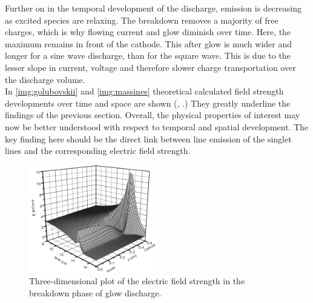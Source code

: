 \documentclass[a4paper,10pt,twoside]{article}
\begin{document}
		Further on in the temporal development of the discharge, emission is decreasing as excited species are relaxing. The breakdown removes a majority of free charges, which is why flowing current and glow diminish over time. Here, the maximum remains in front of the cathode. This after glow is much wider and longer for a sine wave discharge, than for the square wave. This is due to the lesser slope in current, voltage and therefore slower charge transportation over the discharge volume.\\
		In \autoref{img:golubovskii} and \autoref{img:massines} theoretical calculated field strength developments over time and space are shown (\cite{Massines}, \cite{0022-3727-36-1-306}.) They greatly underline the findings of the previous section. Overall, the physical properties of interest may now be better understood with respect to temporal and spatial development. The key finding here should be the direct link between line emission of the singlet lines and the corresponding electric field strength.
		
			\begin{figure}
				\centering
				\includegraphics[width=0.5\textwidth]{figures/706nm@square/golubovskiip47fig9}
				\caption{Three-dimensional plot of the electric field strength in the breakdown phase of glow discharge. \cite{0022-3727-36-1-306}}
				\label{img:golubovskii}
			\end{figure}
		
			\onecolumn
			
\end{document}
